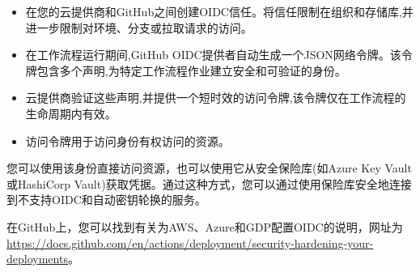 \begin{itemize}
\item 
在您的云提供商和GitHub之间创建OIDC信任。将信任限制在组织和存储库,并进一步限制对环境、分支或拉取请求的访问。

\item 
在工作流程运行期间,GitHub OIDC提供者自动生成一个JSON网络令牌。该令牌包含多个声明,为特定工作流程作业建立安全和可验证的身份。

\item 
云提供商验证这些声明,并提供一个短时效的访问令牌,该令牌仅在工作流程的生命周期内有效。

\item 
访问令牌用于访问身份有权访问的资源。
\end{itemize}

您可以使用该身份直接访问资源，也可以使用它从安全保险库(如Azure Key Vault或HashiCorp Vault)获取凭据。通过这种方式，您可以通过使用保险库安全地连接到不支持OIDC和自动密钥轮换的服务。

在GitHub上，您可以找到有关为AWS、Azure和GDP配置OIDC的说明，网址为\url{https://docs.github.com/en/actions/deployment/security-hardening-your-deployments}。
